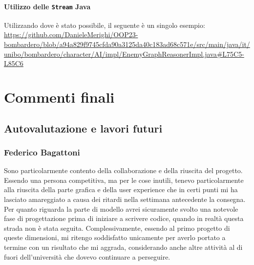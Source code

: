 \documentclass[a4paper,12pt]{report}
\begin{document}
\par
\subsubsection{Utilizzo delle \texttt{Stream} Java}
Utilizzando dove è stato possibile, il seguente è un singolo esempio: 
\url{https://github.com/DanieleMerighi/OOP23-bombardero/blob/a94a829f9745cfda90a3125da40c183ad68c571e/src/main/java/it/unibo/bombardero/character/AI/impl/EnemyGraphReasonerImpl.java#L75C5-L85C6}

\chapter{Commenti finali}

\section{Autovalutazione e lavori futuri}

\subsection{Federico Bagattoni}
Sono particolarmente contento della collaborazione e della riuscita del progetto. Essendo una persona competitiva, ma per le cose inutili, tenevo particolarmente alla riuscita della parte grafica e della user experience che in certi punti mi ha lasciato amareggiato a causa dei ritardi nella settimana antecedente la consegna. 
Per quanto riguarda la parte di modello avrei sicuramente svolto una notevole fase di progettazione prima di iniziare a scrivere codice, quando in realtà questa strada non è stata seguita.
Complessivamente, essendo al primo progetto di queste dimensioni, mi ritengo soddisfatto unicamente per averlo portato a termine con un risultato che mi aggrada, considerando anche altre attività al di fuori dell'università che dovevo continuare a perseguire.
\end{document}
